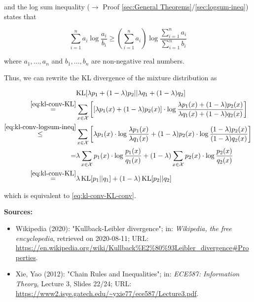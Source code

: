 \documentclass[a4paper,12pt,twoside]{book}
\begin{document}
and the log sum inequality ($\rightarrow$ Proof \ref{sec:General Theorems}/\ref{sec:logsum-ineq}) states that

\begin{equation} \label{eq:kl-conv-logsum-ineq}
\sum_{i=1}^n a_i \log \frac{a_i}{b_i} \geq \left( \sum_{i=1}^n a_i \right) \log \frac{\sum_{i=1}^n a_i}{\sum_{i=1}^n b_i}
\end{equation}

where $a_1, \ldots, a_n$ and $b_1, \ldots, b_n$ are non-negative real numbers.

Thus, we can rewrite the KL divergence of the mixture distribution as

\begin{equation} \label{eq:kl-conv-KL-conv-qed}
\begin{split}
&\mathrm{KL}[\lambda p_1 + (1-\lambda) p_2||\lambda q_1 + (1-\lambda) q_2] \\
\overset{\eqref{eq:kl-conv-KL}}{=} &\sum_{x \in \mathcal{X}} \left[ \left[ \lambda p_1(x) + (1-\lambda) p_2(x) \right] \cdot \log \frac{\lambda p_1(x) + (1-\lambda) p_2(x)}{\lambda q_1(x) + (1-\lambda) q_2(x)} \right] \\
\overset{\eqref{eq:kl-conv-logsum-ineq}}{\leq} &\sum_{x \in \mathcal{X}} \left[ \lambda p_1(x) \cdot \log \frac{\lambda p_1(x)}{\lambda q_1(x)} + (1-\lambda) p_2(x) \cdot \log \frac{(1-\lambda) p_2(x)}{(1-\lambda) q_2(x)} \right] \\
= &\lambda \sum_{x \in \mathcal{X}} p_1(x) \cdot \log \frac{p_1(x)}{q_1(x)} + (1-\lambda) \sum_{x \in \mathcal{X}} p_2(x) \cdot \log \frac{p_2(x)}{q_2(x)} \\
\overset{\eqref{eq:kl-conv-KL}}{=} &\lambda \, \mathrm{KL}[p_1||q_1] + (1-\lambda) \, \mathrm{KL}[p_2||q_2]
\end{split}
\end{equation}

which is equivalent to \eqref{eq:kl-conv-KL-conv}.


\vspace{1em}
\textbf{Sources:}
\begin{itemize}
\item Wikipedia (2020): "Kullback-Leibler divergence"; in: \textit{Wikipedia, the free encyclopedia}, retrieved on 2020-08-11; URL: \url{https://en.wikipedia.org/wiki/Kullback%E2%80%93Leibler_divergence#Properties}.
\item Xie, Yao (2012): "Chain Rules and Inequalities"; in: \textit{ECE587: Information Theory}, Lecture 3, Slides 22/24; URL: \url{https://www2.isye.gatech.edu/~yxie77/ece587/Lecture3.pdf}.
\end{itemize}
\end{document}
